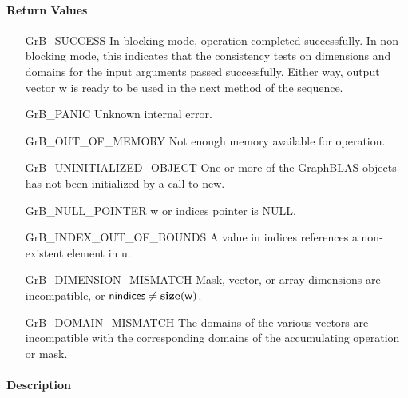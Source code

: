 \paragraph{Return Values}

\begin{itemize}[leftmargin=2.1in]
    \item[{\sf GrB\_SUCCESS}]         In blocking mode, operation
	completed successfully. In non-blocking mode, this indicates
	that the consistency tests on dimensions and domains for the
	input arguments passed successfully. Either way, output vector
	{\sf w} is ready to be used in the next method of the sequence.

    \item[{\sf GrB\_PANIC}]           Unknown internal error.
    
    \item[{\sf GrB\_OUT\_OF\_MEMORY}]        Not enough memory available for operation.
    
    \item[{\sf GrB\_UNINITIALIZED\_OBJECT}]        One or more of the GraphBLAS objects has
    not been initialized by a call to {\sf new}.
    
    \item[{\sf GrB\_NULL\_POINTER}]  {\sf w} or {\sf indices} pointer is {\sf NULL}.

    \item[{\sf GrB\_INDEX\_OUT\_OF\_BOUNDS}]  A value in {\sf indices} references a 
    non-existent element in {\sf u}.
    
    \item[{\sf GrB\_DIMENSION\_MISMATCH}] Mask, vector, or array dimensions are
    incompatible, or ${\sf nindices} \neq \bold{size}({\sf w})$. 
    
    \item[{\sf GrB\_DOMAIN\_MISMATCH}]    The domains of the various
	vectors are incompatible with the corresponding domains of the
	accumulating operation or mask.
\end{itemize}

\paragraph{Description}

